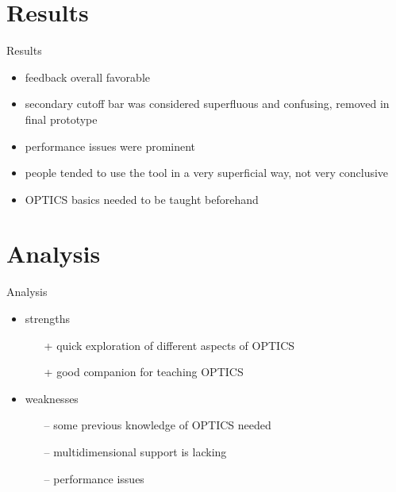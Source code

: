 \documentclass[naustrian]{beamer}
\begin{document}

\section{Results}

\begin{frame}{Results}
    \begin{itemize}
        \item feedback overall favorable
        \item secondary cutoff bar was considered superfluous and confusing, removed in final prototype
        \item performance issues were prominent
        \item people tended to use the tool in a very superficial way, not very conclusive
        \item OPTICS basics needed to be taught beforehand
    \end{itemize}
\end{frame}

\section{Analysis}

\begin{frame}{Analysis}
    \begin{itemize}
        \item strengths
            \begin{itemize}
                \item[\color{asparagus}+] quick exploration of different aspects of OPTICS
                \item[\color{asparagus}+] good companion for teaching OPTICS
            \end{itemize}
        \item weaknesses
            \begin{itemize}
                \item[\color{alizarin}--] some previous knowledge of OPTICS needed
                \item[\color{alizarin}--] multidimensional support is lacking
                \item[\color{alizarin}--] performance issues
            \end{itemize}
    \end{itemize}
\end{frame}

\end{document}
